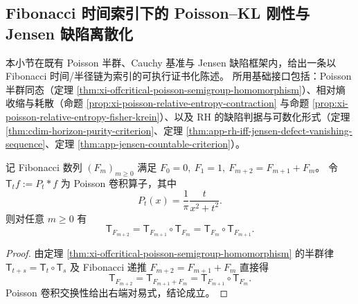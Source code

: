 \subsection{Fibonacci 时间索引下的 Poisson--KL 刚性与 Jensen 缺陷离散化}\label{subsec:cdim-fibonacci-poisson-kl-rh-discretization}
本小节在既有 Poisson 半群、Cauchy 基准与 Jensen 缺陷框架内，给出一条以 Fibonacci 时间/半径链为索引的可执行证书化陈述。
所用基础接口包括：Poisson 半群同态（定理 \ref{thm:xi-offcritical-poisson-semigroup-homomorphism}）、相对熵收缩与耗散（命题 \ref{prop:xi-poisson-relative-entropy-contraction} 与命题 \ref{prop:xi-poisson-relative-entropy-fisher-krein}）、以及 RH 的缺陷判据与可数化形式（定理 \ref{thm:cdim-horizon-purity-criterion}、定理 \ref{thm:app-rh-iff-jensen-defect-vanishing-sequence}、定理 \ref{thm:app-jensen-countable-criterion}）。

\begin{conclusion}\label{con:cdim-fibonacci-poisson-semigroup-factorization}
记 Fibonacci 数列 \((F_m)_{m\ge 0}\) 满足
\(
F_0=0,\ F_1=1,\ F_{m+2}=F_{m+1}+F_m
\)。
令 \(\mathsf T_t f:=P_t*f\) 为 Poisson 卷积算子，其中
\[
P_t(x)=\frac1\pi\frac{t}{x^2+t^2}.
\]
则对任意 \(m\ge 0\) 有
\[
\mathsf T_{F_{m+2}}
=
\mathsf T_{F_{m+1}}\circ \mathsf T_{F_m}
=
\mathsf T_{F_m}\circ \mathsf T_{F_{m+1}}.
\]
\end{conclusion}
\begin{proof}
由定理 \ref{thm:xi-offcritical-poisson-semigroup-homomorphism} 的半群律
\(
\mathsf T_{t+s}=\mathsf T_t\circ\mathsf T_s
\)
及 Fibonacci 递推
\(
F_{m+2}=F_{m+1}+F_m
\)
直接得
\[
\mathsf T_{F_{m+2}}
=
\mathsf T_{F_{m+1}+F_m}
=
\mathsf T_{F_{m+1}}\circ\mathsf T_{F_m}.
\]
Poisson 卷积交换性给出右端对易式，结论成立。
\end{proof}

